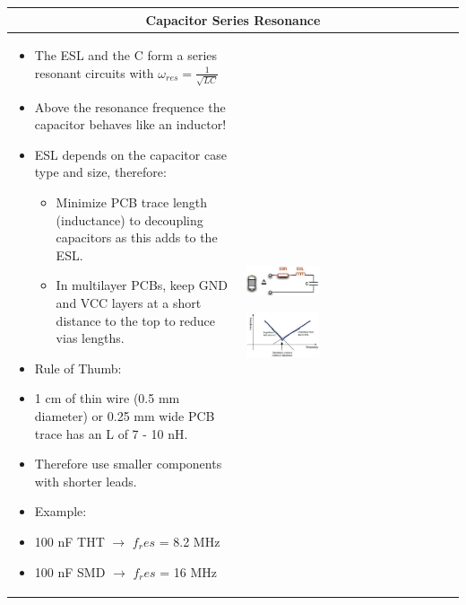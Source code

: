 		\begin{table}[h!]
		\centering
		\begin{tabular}{|m{}|m{}|}
				\multicolumn{2}{c}{\textbf{Capacitor Series Resonance}}
			\\
			\hline
				\begin{itemize}
					\item The ESL and the C form a series resonant circuits with $\omega_{res} = \frac{1}{\sqrt{LC}}$

					\item Above the resonance frequence the capacitor behaves like an inductor!
					\item ESL depends on the capacitor case type and size, therefore: 
					\begin{itemize}
						\item Minimize PCB trace length (inductance) to decoupling capacitors as this adds to the ESL. 
						\item In multilayer PCBs, keep GND and VCC layers at a short distance to the top to reduce vias lengths. 
					\end{itemize}
					\setlength{\itemsep}{-4pt}
					\item Rule of Thumb: 
					\item[] 1 cm of thin wire (0.5 mm diameter) or 0.25 mm wide PCB trace has an L of 7 - 10 nH. 
					\item[] Therefore use smaller components with shorter leads. 
					\item[] Example: 
					\item[] 100 nF THT $\rightarrow$ $f_res$ = 8.2 MHz
					\item[] 100 nF SMD $\rightarrow$ $f_res$ = 16 MHz
				\end{itemize}
			& 
				\begin{center}\includegraphics[width=0.35\textwidth]{images/EquivalentCircuit.png}\end{center}  
				\begin{center}\includegraphics[width=0.35\textwidth]{images/CapImpedance.png}\end{center}  
			\\	
			\hline
			\end{tabular}
		\end{table}	
		
